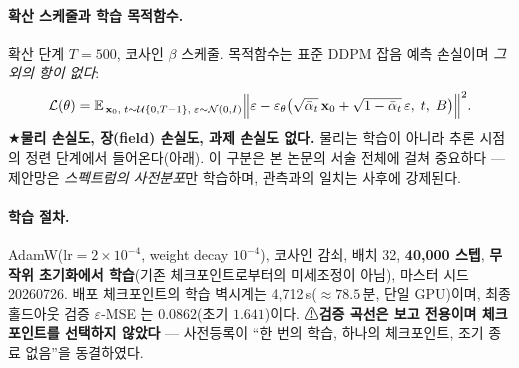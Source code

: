 \documentclass[11pt]{report}
\numberwithin{equation}{chapter}
\numberwithin{figure}{chapter}
\numberwithin{table}{chapter}
\begin{document}
\paragraph{확산 스케줄과 학습 목적함수.}
확산 단계 $T = 500$, 코사인 $\beta$ 스케줄.
목적함수는 표준 DDPM 잡음 예측 손실이며 \emph{그 외의 항이 없다}:
\begin{equation}
\mathcal{L}(\theta) = \mathbb{E}_{\,\mathbf{x}_0,\;t \sim \mathcal{U}\{0,T-1\},\;
\varepsilon \sim \mathcal{N}(0,I)}
\Bigl\| \varepsilon - \varepsilon_\theta\bigl(\sqrt{\bar\alpha_t}\,\mathbf{x}_0
+ \sqrt{1-\bar\alpha_t}\,\varepsilon,\; t,\; B\bigr) \Bigr\|^2 .
\label{eq:waveprior-loss}
\end{equation}
★\textbf{물리 손실도, 장(field) 손실도, 과제 손실도 없다.} 물리는 학습이 아니라
추론 시점의 정련 단계에서 들어온다(아래). 이 구분은 본 논문의 서술 전체에 걸쳐 중요하다 ---
제안망은 \emph{스펙트럼의 사전분포}만 학습하며, 관측과의 일치는 사후에 강제된다.

\paragraph{학습 절차.}
AdamW($\text{lr}=2\times10^{-4}$, weight decay $10^{-4}$), 코사인 감쇠,
배치 32, \textbf{40{,}000 스텝}, \textbf{무작위 초기화에서 학습}(기존 체크포인트로부터의
미세조정이 아님), 마스터 시드 20260726. 배포 체크포인트의 학습 벽시계는
4{,}712\,s($\approx 78.5$\,분, 단일 GPU)이며, 최종 홀드아웃 검증 $\varepsilon$-MSE 는
$0.0862$(초기 $1.641$)이다. ⚠\textbf{검증 곡선은 보고 전용이며 체크포인트를 선택하지
않았다} --- 사전등록이 ``한 번의 학습, 하나의 체크포인트, 조기 종료 없음''을 동결하였다.
\end{document}
